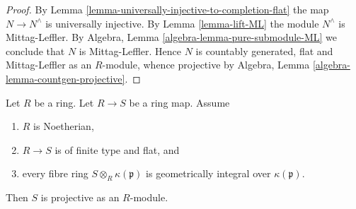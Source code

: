 \begin{proof}
By
Lemma \ref{lemma-universally-injective-to-completion-flat}
the map $N \to N^\wedge$ is universally injective.
By
Lemma \ref{lemma-lift-ML}
the module $N^\wedge$ is Mittag-Leffler.
By
Algebra, Lemma \ref{algebra-lemma-pure-submodule-ML}
we conclude that $N$ is Mittag-Leffler.
Hence $N$ is countably generated, flat and Mittag-Leffler as an $R$-module,
whence projective by
Algebra, Lemma \ref{algebra-lemma-countgen-projective}.
\end{proof}

\begin{lemma}
\label{lemma-fibres-irreducible-flat-projective}
Let $R$ be a ring.
Let $R \to S$ be a ring map.
Assume
\begin{enumerate}
\item $R$ is Noetherian,
\item $R \to S$ is of finite type and flat, and
\item every fibre ring $S \otimes_R \kappa(\mathfrak p)$ is
geometrically integral over $\kappa(\mathfrak p)$.
\end{enumerate}
Then $S$ is projective as an $R$-module.
\end{lemma}


